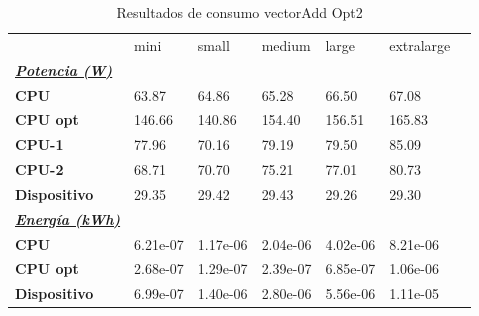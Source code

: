 \begin{table}[H]
    \centering
    \begin{tabular}{lllllll}
    \rowcolor[HTML]{DAE8FC} \ & mini & small & medium & 	large & 	extralarge \\
    \cellcolor[HTML]{DAE8FC} \textbf{\textbf{{\emph{{\underline{{Potencia (W)}}}}}}} &  &  &  & 	 & 	 \\
    \rowcolor[HTML]{EFEFEF} \cellcolor[HTML]{DAE8FC} \textbf{CPU} & 63.87 & 64.86 & 65.28 & 	66.50 & 	67.08 \\
    \cellcolor[HTML]{DAE8FC} \textbf{CPU opt} & 146.66 & 140.86 & 154.40 & 	156.51 & 	165.83 \\
    \rowcolor[HTML]{EFEFEF} \cellcolor[HTML]{DAE8FC} \textbf{\quad CPU-1} & 77.96 & 70.16 & 79.19 & 	79.50 & 	85.09 \\
    \cellcolor[HTML]{DAE8FC} \textbf{\quad CPU-2} & 68.71 & 70.70 & 75.21 & 	77.01 & 	80.73 \\
    \rowcolor[HTML]{EFEFEF} \cellcolor[HTML]{DAE8FC} \textbf{Dispositivo} & 29.35 & 29.42 & 29.43 & 	29.26 & 	29.30 \\
    \cellcolor[HTML]{DAE8FC} \textbf{\textbf{{\emph{{\underline{{Energía (kWh)}}}}}}} &  &  &  & 	 & 	 \\
    \rowcolor[HTML]{EFEFEF} \cellcolor[HTML]{DAE8FC} \textbf{CPU} & 6.21e-07 & 1.17e-06 & 2.04e-06 & 	4.02e-06 & 	8.21e-06 \\
    \cellcolor[HTML]{DAE8FC} \textbf{CPU opt} & 2.68e-07 & 1.29e-07 & 2.39e-07 & 	6.85e-07 & 	1.06e-06 \\
    \rowcolor[HTML]{EFEFEF} \cellcolor[HTML]{DAE8FC} \textbf{Dispositivo} & 6.99e-07 & 1.40e-06 & 2.80e-06 & 	5.56e-06 & 	1.11e-05 \\
    \end{tabular}
    \caption[Resultados de consumo vectorAdd Opt2]{{Resultados de consumo vectorAdd Opt2}}
    \label{table_test_vectorAdd_Opt2_hw_powerResults}
\end{table}